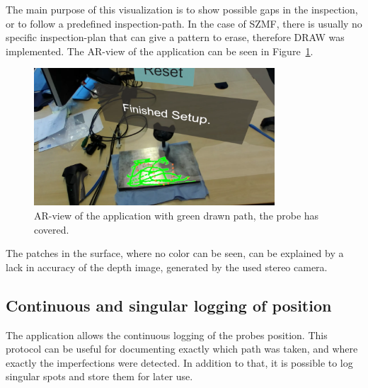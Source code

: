 \documentclass{VRARWorkshop}
\begin{document}
The main purpose of this visualization is to show possible gaps in the inspection, or to follow a predefined inspection-path.
In the case of SZMF, there is usually no specific inspection-plan that can give a pattern to erase, therefore {\sc DRAW} was implemented.
The AR-view of the application can be seen in Figure~\ref{fig:ARView}.

\begin{figure}[h!]
    \begin{center}
        \includegraphics[width=90mm]{images/AR-Screenshot}
        \caption{\label{fig:ARView} AR-view of the application with green drawn path, the probe has covered.}
    \end{center}
\end{figure}

The patches in the surface, where no color can be seen, can be explained by a lack in accuracy of the depth image, generated by the used stereo camera.

\subsection{Continuous and singular logging of position}
The application allows the continuous logging of the probes position.
This protocol can be useful for documenting exactly which path was taken, and where exactly the imperfections were detected.
In addition to that, it is possible to log singular spots and store them for later use.
\end{document}
